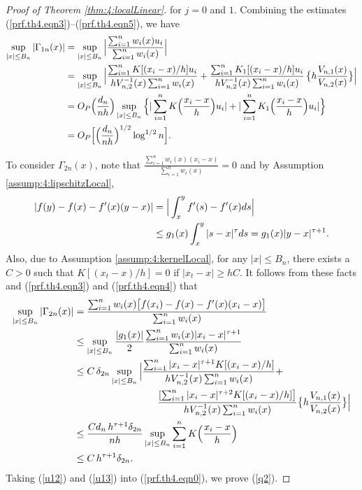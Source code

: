 \begin{proof}[Proof of Theorem \ref {thm:4:localLinear}]
\ee
for $j = 0$ and $1$.
Combining the estimates (\ref{prf.th4.eqn3})--(\ref{prf.th4.eqn5}), we have
\begin{align}
 \sup_{|x| \le B_n} | \Gamma_{1n}(x) |  &=  \sup_{|x| \le B_n} \Big |\frac{\sum_{i = 1}^n w_i(x) u_i }{\sum_{i = 1}^n w_i(x)}  \Big | \no\\
 &= \sup_{|x| \le B_n} \Big | \frac{ \sum_{i = 1}^n K [(x_i - x)/h] u_i  }{  hV_{n,2}^{-1}(x) \sum_{i = 1}^n w_i(x)} + \frac{ \sum_{i = 1}^n  K_1[ (x_i - x)/h] u_i}{  hV_{n,2}^{-1}(x) \sum_{i = 1}^n w_i(x) }\,\big \{h\frac{ V_{n, 1}(x)}{V_{n,2}(x)}\big \}\Big | \no\\
 &= O_P \Big ( \frac{d_n}{n h} \Big ) \sup_{|x| \le B_n} \Big \{|\sum_{i = 1}^n K \Big (\frac{x_i - x}{h}\Big ) u_i| + | \sum_{i = 1}^n  K_1\Big (\frac{x_i - x}{h}\Big) u_i   | \Big \} \no\\
 &= O_P \Big [ \Big (\frac{d_n}{nh} \Big )^{1/2} \log^{1/2} n \Big ]. \la {u12}
 \end{align}

To consider  $\Gamma_{2n}(x)$, note that $\frac{\sum_{i = 1}^n w_i(x)  ( x_i-  x) }{\sum_{i = 1}^n w_i(x)}   = 0$ and by Assumption \ref{assump:4:lipschitzLocal},
\begin{align}
|f(y) - f(x) - f'(x)(y - x)| &= \Big | \int_x^y f'(s) - f'(x) ds\Big | \nonumber\\
&\le  g_1(x)\int_{x}^y |s - x|^{\tau} ds = g_1(x)|y - x|^{\tau + 1}. \nonumber
\end{align}
Also, due to Assumption \ref{assump:4:kernelLocal}, for any $|x| \le B_n$, there exists a $C>0$ such that $K[(x_t-x)/h]=0$ if $|x_t-x|\ge hC$. It follows from these facts and (\ref {prf.th4.eqn3}) and
(\ref {prf.th4.eqn4}) that
\begin{align}
\sup_{|x| \le B_n} | \Gamma_{2n}(x) | &= \frac{\sum_{i = 1}^n w_i(x) \big [ f(x_i) - f(x) - f'(x) (x_i - x) \big ] }{\sum_{i = 1}^n w_i(x)}  \no\\
&\le \sup_{|x| \le B_n} \frac{| g_1(x)|}{2} \frac{\sum_{i = 1}^n w_i(x)  | x_i-  x|^{\tau + 1} }{\sum_{i = 1}^n w_i(x)}  \no\\
&\le C\, \de_{2n}  \sup_{|x| \le B_n} \Big |\frac{ \sum_{i = 1}^n | x_i-  x|^{\tau + 1}K[ (x_i - x)/h]   }{ h V^{-1}_{n, 2}(x) \sum_{i = 1}^n w_i(x)}  +  \no\\
&\hskip 3cm \frac{ [\sum_{i = 1}^n | x_i-  x|^{\tau + 2}K [(x_i - x)/h]  \big ]}{ h V^{-1}_{n, 2}(x) \sum_{i = 1}^n w_i(x) } \big \{h\frac{ V_{n, 1}(x)}{V_{n,2}(x)}\big \}  \Big |\no\\
&\le  \frac{Cd_n\, h^{\tau + 1}\de_{2n} }{n h}  \sup_{|x| \le B_n} \sum_{i = 1}^n K \Big (\frac{x_i - x}{h} \Big )    \no\\
&\le C\,h^{\tau + 1} \de_{2n}.\la {u13}
\end{align} 
Taking (\ref {u12}) and (\ref {u13}) into (\ref {prf.th4.eqn0}), we prove (\ref {q2}).
\end{proof}



